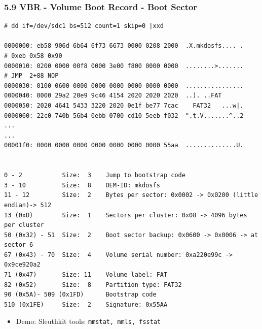 \begin{frame}[fragile]
  \frametitle{5.9 VBR - Volume Boot Record - Boot Sector}
  \begin{lstlisting}[basicstyle=\tiny]
# dd if=/dev/sdc1 bs=512 count=1 skip=0 |xxd

0000000: eb58 906d 6b64 6f73 6673 0000 0208 2000  .X.mkdosfs.... .     # 0xeb 0x58 0x90
0000010: 0200 0000 00f8 0000 3e00 f800 0000 0000  ........>.......     # JMP  2+88 NOP
0000030: 0100 0600 0000 0000 0000 0000 0000 0000  ................
0000040: 0000 29a2 20e9 9c46 4154 2020 2020 2020  ..). ..FAT      
0000050: 2020 4641 5433 3220 2020 0e1f be77 7cac    FAT32   ...w|.
0000060: 22c0 740b 56b4 0ebb 0700 cd10 5eeb f032  ".t.V.......^..2
...
...
00001f0: 0000 0000 0000 0000 0000 0000 0000 55aa  ..............U.


0 - 2           Size:  3    Jump to bootstrap code
3 - 10          Size:  8    OEM-ID: mkdosfs
11 - 12         Size:  2    Bytes per sector: 0x0002 -> 0x0200 (little endian)-> 512
13 (0xD)        Size:  1    Sectors per cluster: 0x08 -> 4096 bytes per cluster
50 (0x32) - 51  Size:  2    Boot sector backup: 0x0600 -> 0x0006 -> at sector 6
67 (0x43) - 70  Size:  4    Volume serial number: 0xa220e99c -> 0x9ce920a2
71 (0x47)       Size: 11    Volume label: FAT
82 (0x52)       Size:  8    Partition type: FAT32
90 (0x5A)- 509 (0x1FD)	    Bootstrap code
510 (0x1FE)     Size:  2    Signature: 0x55AA
  \end{lstlisting}
    \begin{itemize}
        \item Demo: Sleuthkit tools: \texttt{mmstat, mmls, fsstat}
    \end{itemize}
\end{frame}




